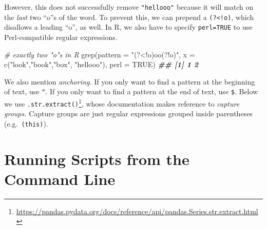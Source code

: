 \documentclass[
  12pt,
  krantz2]{krantz}
\makeatletter
\newenvironment{Shaded}{\begin{snugshade}}{\end{snugshade}}
\newcommand{\AttributeTok}[1]{\textcolor[rgb]{0.61,0.61,0.61}{#1}}
\newcommand{\BuiltInTok}[1]{#1}
\newcommand{\CommentTok}[1]{\textcolor[rgb]{0.37,0.37,0.37}{\textit{#1}}}
\newcommand{\ConstantTok}[1]{\textcolor[rgb]{0,0,0}{#1}}
\newcommand{\DocumentationTok}[1]{\textcolor[rgb]{0.37,0.37,0.37}{\textbf{\textit{#1}}}}
\newcommand{\FunctionTok}[1]{\textcolor[rgb]{0,0,0}{#1}}
\newcommand{\NormalTok}[1]{#1}
\newcommand{\OperatorTok}[1]{\textcolor[rgb]{0.43,0.43,0.43}{\textbf{#1}}}
\newcommand{\StringTok}[1]{\textcolor[rgb]{0.5,0.5,0.5}{#1}}
\newcommand{\VerbatimStringTok}[1]{\textcolor[rgb]{0.5,0.5,0.5}{#1}}
\renewcommand{\href}[2]{#2\footnote{\url{#1}}}
\newenvironment{kframe}{%
\medskip{}
\setlength{\fboxsep}{.8em}
 \def\at@end@of@kframe{}%
 \ifinner\ifhmode%
  \def\at@end@of@kframe{\end{minipage}}%
  \begin{minipage}{\columnwidth}%
 \fi\fi%
 \def\FrameCommand##1{\hskip\@totalleftmargin \hskip-\fboxsep
 \colorbox{shadecolor}{##1}\hskip-\fboxsep
     \hskip-\linewidth \hskip-\@totalleftmargin \hskip\columnwidth}%
 \MakeFramed {\advance\hsize-\width
   \@totalleftmargin\z@ \linewidth\hsize
   \@setminipage}}%
 {\par\unskip\endMakeFramed%
 \at@end@of@kframe}
\renewenvironment{Shaded}{\begin{kframe}}{\end{kframe}}
\makeatother
\begin{document}
However, this does not successfully remove \texttt{"hellooo"} because it will match on the \emph{last} two ``o''s of the word. To prevent this, we can prepend a \texttt{(?\textless{}!o)}, which disallows a leading ``o'', as well. In R, we also have to specify \texttt{perl=TRUE} to use Perl-compatible regular expressions.

\begin{Shaded}
\begin{Highlighting}[]
\CommentTok{\# exactly two "o"s in R}
\FunctionTok{grep}\NormalTok{(}\AttributeTok{pattern =} \StringTok{"(?\textless{}!o)oo(?!o)"}\NormalTok{, }\AttributeTok{x =} \FunctionTok{c}\NormalTok{(}\StringTok{"look"}\NormalTok{,}\StringTok{"book"}\NormalTok{,}\StringTok{"box"}\NormalTok{, }\StringTok{"hellooo"}\NormalTok{), }\AttributeTok{perl =} \ConstantTok{TRUE}\NormalTok{)}
\DocumentationTok{\#\# [1] 1 2}
\end{Highlighting}
\end{Shaded}

We also mention \emph{anchoring.} If you only want to find a pattern at the beginning of text, use \texttt{\^{}}. If you only want to find a pattern at the end of text, use \texttt{\$}. Below we use \href{https://pandas.pydata.org/docs/reference/api/pandas.Series.str.extract.html}{\texttt{.str.extract()}}, whose documentation makes reference to \emph{capture groups.} Capture groups are just regular expressions grouped inside parentheses (e.g.~\texttt{(this)}).

\begin{Shaded}
\end{Shaded}

\hypertarget{running-scripts-from-the-command-line}{%
\chapter{Running Scripts from the Command Line}\label{running-scripts-from-the-command-line}}
\end{document}
